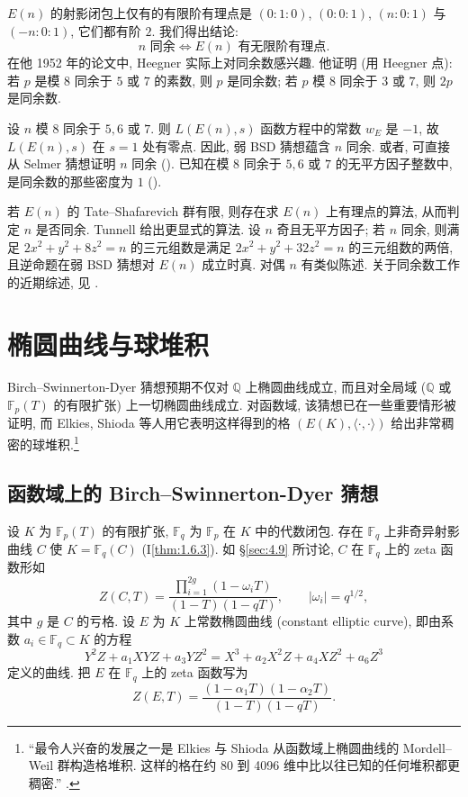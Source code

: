 $E(n)$ 的射影闭包上仅有的有限阶有理点是 $(0:1:0)$, $(0:0:1)$, $(n:0:1)$ 与 $(-n:0:1)$, 它们都有阶 $2$. 我们得出结论:
\[
n \text{ 同余} \iff E(n) \text{ 有无限阶有理点}.
\]
在他 1952 年的论文中, Heegner 实际上对同余数感兴趣. 他证明 (用 Heegner 点): 若 $p$ 是模 $8$ 同余于 $5$ 或 $7$ 的素数, 则 $p$ 是同余数; 若 $p$ 模 $8$ 同余于 $3$ 或 $7$, 则 $2p$ 是同余数.

设 $n$ 模 $8$ 同余于 $5, 6$ 或 $7$. 则 $L(E(n), s)$ 函数方程中的常数 $w_E$ 是 $-1$, 故 $L(E(n), s)$ 在 $s = 1$ 处有零点. 因此, 弱 BSD 猜想蕴含 $n$ 同余. 或者, 可直接从 Selmer 猜想证明 $n$ 同余 (\cite{stephens1975}). 已知在模 $8$ 同余于 $5, 6$ 或 $7$ 的无平方因子整数中, 是同余数的那些密度为 $1$ (\cite{kriz2020}).

若 $E(n)$ 的 Tate--Shafarevich 群有限, 则存在求 $E(n)$ 上有理点的算法, 从而判定 $n$ 是否同余. Tunnell 给出更显式的算法. 设 $n$ 奇且无平方因子; 若 $n$ 同余, 则满足 $2x^2 + y^2 + 8z^2 = n$ 的三元组数是满足 $2x^2 + y^2 + 32z^2 = n$ 的三元组数的两倍, 且逆命题在弱 BSD 猜想对 $E(n)$ 成立时真. 对偶 $n$ 有类似陈述. 关于同余数工作的近期综述, 见 \cite{coates2017}.

\section{椭圆曲线与球堆积}\label{sec:4.11}

Birch--Swinnerton-Dyer 猜想预期不仅对 $\mathbb{Q}$ 上椭圆曲线成立, 而且对全局域 ($\mathbb{Q}$ 或 $\mathbb{F}_p(T)$ 的有限扩张) 上一切椭圆曲线成立. 对函数域, 该猜想已在一些重要情形被证明, 而 Elkies, Shioda 等人用它表明这样得到的格 $(E(K), \langle\cdot,\cdot\rangle)$ 给出非常稠密的球堆积.\footnote{``最令人兴奋的发展之一是 Elkies 与 Shioda 从函数域上椭圆曲线的 Mordell--Weil 群构造格堆积. 这样的格在约 80 到 4096 维中比以往已知的任何堆积都更稠密.'' \cite[p.~xviii]{conway1999}.}

\subsection*{函数域上的 Birch--Swinnerton-Dyer 猜想}

设 $K$ 为 $\mathbb{F}_p(T)$ 的有限扩张, $\mathbb{F}_q$ 为 $\mathbb{F}_p$ 在 $K$ 中的代数闭包. 存在 $\mathbb{F}_q$ 上非奇异射影曲线 $C$ 使 $K = \mathbb{F}_q(C)$ (I\ref{thm:1.6.3}). 如 \S\ref{sec:4.9} 所讨论, $C$ 在 $\mathbb{F}_q$ 上的 zeta 函数形如
\[
Z(C, T) = \frac{\prod_{i=1}^{2g}(1-\omega_iT)}{(1-T)(1-qT)}, \qquad |\omega_i| = q^{1/2},
\]
其中 $g$ 是 $C$ 的亏格. 设 $E$ 为 $K$ 上常数椭圆曲线 (constant elliptic curve), 即由系数 $a_i\in\mathbb{F}_q\subset K$ 的方程
\[
Y^2Z + a_1XYZ + a_3YZ^2 = X^3 + a_2X^2Z + a_4XZ^2 + a_6Z^3
\]
定义的曲线. 把 $E$ 在 $\mathbb{F}_q$ 上的 zeta 函数写为
\[
Z(E, T) = \frac{(1-\alpha_1T)(1-\alpha_2T)}{(1-T)(1-qT)}.
\]

